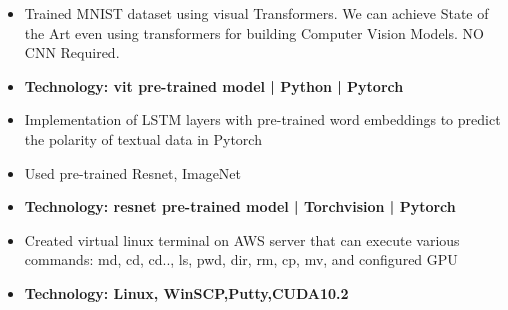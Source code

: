 
\begin{itemize}
\item Trained MNIST dataset using visual Transformers. We can achieve State of the Art even using transformers for building Computer Vision Models. NO CNN Required.
\item\bf{Technology}{: vit pre-trained model | Python | Pytorch}
\end{itemize}
\smallskip
{}
\begin{itemize}
\item Implementation of LSTM layers with pre-trained word embeddings to predict the polarity of textual data in Pytorch
\end{itemize}
\smallskip
{}
\begin{itemize}
\item Used pre-trained Resnet, ImageNet
\item\bf{Technology}{: resnet pre-trained model | Torchvision | Pytorch}
\end{itemize}
\smallskip
{}
\begin{itemize}
\item Created virtual linux terminal on AWS server that can execute various commands: md, cd, cd.., ls, pwd, dir, rm, cp, mv, and configured GPU
\item\bf{Technology}{: Linux, WinSCP,Putty,CUDA10.2}
\end{itemize}

